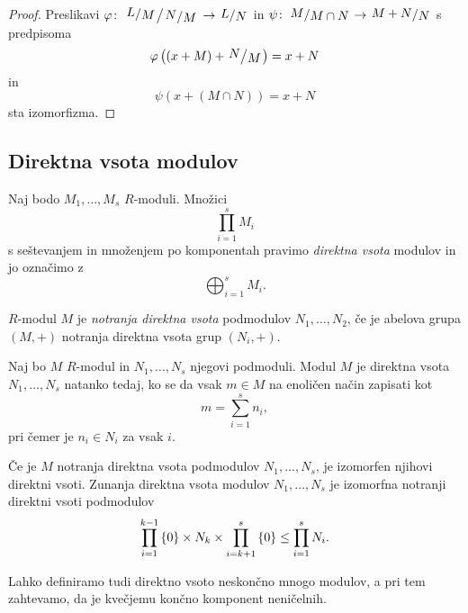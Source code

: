 \begin{proof}
Preslikavi
$\varphi \colon \kvoc{\kvoc{L}{M}}{\kvoc{N}{M}} \to \kvoc{L}{N}$ in
$\psi \colon \kvoc{M}{M \cap N} \to \kvoc{M+N}{N}$ s predpisoma
\[
\varphi \br{(x + M) + \kvoc{N}{M}} = x + N
\]
in
\[
\psi(x + (M \cap N)) = x + N
\]
sta izomorfizma.
\end{proof}

\newpage

\subsection{Direktna vsota modulov}

\begin{definicija}
Naj bodo $M_1, \dots, M_s$ $R$-moduli. Množici
\[
\prod_{i=1}^s M_i
\]
s seštevanjem in množenjem po komponentah pravimo
\emph{direktna vsota} modulov in jo
označimo z
\[
\bigoplus_{i=1}^s M_i.
\]
\end{definicija}

\begin{definicija}
$R$-modul $M$ je \emph{notranja direktna vsota} podmodulov
$N_1, \dots, N_2$, če je abelova grupa $(M, +)$ notranja direktna
vsota grup $(N_i, +)$.
\end{definicija}

\begin{trditev}
Naj bo $M$ $R$-modul in $N_1, \dots, N_s$ njegovi podmoduli. Modul
$M$ je direktna vsota $N_1, \dots, N_s$ natanko tedaj, ko se da
vsak $m \in M$ na enoličen način zapisati kot
\[
m = \sum_{i=1}^s n_i,
\]
pri čemer je $n_i \in N_i$ za vsak $i$.
\end{trditev}

\obvs

\begin{trditev}
Če je $M$ notranja direktna vsota podmodulov $N_1, \dots, N_s$, je
izomorfen njihovi direktni vsoti. Zunanja direktna vsota modulov
$N_1, \dots, N_s$ je izomorfna notranji direktni vsoti podmodulov
\[
\prod_{i=1}^{k-1} \left\{0\right\} \times
N_k \times \prod_{i=k+1}^s \left\{0\right\} \leq \prod_{i=1}^s N_i.
\]
\end{trditev}

\obvs

\begin{opomba}
Lahko definiramo tudi direktno vsoto neskončno mnogo modulov, a pri
tem zahtevamo, da je kvečjemu končno komponent neničelnih.
\end{opomba}

\newpage

